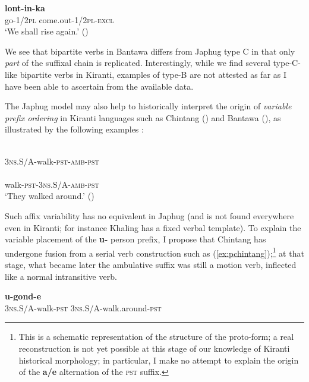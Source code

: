 \documentclass[oneside,a4paper,11pt]{article}
\newcommand{\ipa}[1]{{\phon\textbf{#1}}}
\newcommand{\refb}[1]{(\ref{#1})}
\begin{document}
 \begin{exe}
\ex  \label{ex:kharin}
\gll \ipa{kʰar-in} \ipa{lont-in-ka} \\
go-\textsc{1/2pl} come.out-\textsc{1/2pl-excl} \\
\glt `We shall rise again.' (\citealt[254]{doornenbal09})
\end{exe}

We see that bipartite verbs in Bantawa differs from Japhug type C in that only \textit{part} of the suffixal chain is replicated. Interestingly, while we find several type-C-like bipartite verbs in Kiranti, examples of type-B are not attested as far as I have been able to ascertain from the available data.

The Japhug model may also help to historically interpret the origin of \textit{variable prefix ordering}  in Kiranti languages such as Chintang (\citealt{bickel07chintang}) and Bantawa (\citealt[170-172]{doornenbal09}), as illustrated by the following examples :

\begin{exe}
\ex \label{ex:ukosagonde}
\gll \ipa{u-kos-a-gond-e} \\
\textsc{3ns.S/A}-walk-\textsc{pst-amb-pst} \\
\ex \label{ex:kosaugonde}
\gll \ipa{kos-a-u-gond-e} \\
walk-\textsc{pst-3ns.S/A-amb-pst} \\
\glt ‘They walked around.’ (\citealt[51]{bickel07chintang})
\end{exe}


Such affix variability has no equivalent in Japhug (and is not found everywhere even in Kiranti; for instance Khaling has a fixed verbal template). To explain the variable placement of the \ipa{u-} person prefix, I propose that Chintang has undergone  fusion from a serial verb construction such as \refb{ex:pchintang};\footnote{This is a schematic representation of the structure of the proto-form; a real reconstruction is not yet possible at this stage of our knowledge of Kiranti historical morphology; in particular, I make no attempt to explain the origin of the \ipa{a/e} alternation of the \textsc{pst} suffix. } at that stage, what became later the ambulative suffix was still a motion verb, inflected like a normal intransitive verb.

\begin{exe}
\ex \label{ex:pchintang}
\gll *\ipa{u-kos-e} \ipa{u-gond-e} \\
\textsc{3ns.S/A}-walk-\textsc{pst} \textsc{3ns.S/A}-walk.around-\textsc{pst} \\
\end{exe}
\end{document}
